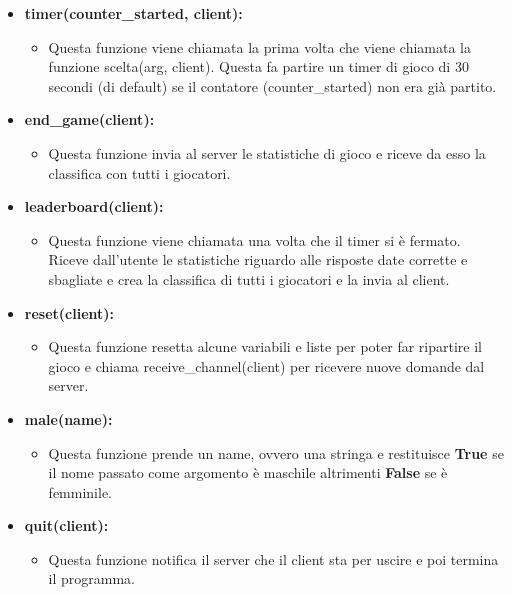 \begin{itemize}
\begin{itemize}
	\end{itemize}
	\item \textbf{\normalsize timer(counter\_started, client): }
	\begin{itemize}
		\item \textsf{\normalsize Questa funzione viene chiamata la prima volta che viene chiamata la funzione scelta(arg, client). Questa fa partire un timer di gioco di 30 secondi (di default) se il contatore (counter\_started) non era già partito.}
	\end{itemize}
	\item \textbf{\normalsize end\_game(client): }
	\begin{itemize}
		\item \textsf{\normalsize Questa funzione invia al server le statistiche di gioco e riceve da esso la classifica con tutti i giocatori.}
	\end{itemize}
	\item \textbf{\normalsize leaderboard(client): }
	\begin{itemize}
		\item \textsf{\normalsize Questa funzione viene chiamata una volta che il timer si è fermato. Riceve dall'utente le statistiche riguardo alle risposte date corrette e sbagliate e crea la classifica di tutti i giocatori e la invia al client.}
	\end{itemize}
	\item \textbf{\normalsize reset(client): }
	\begin{itemize}
		\item \textsf{\normalsize Questa funzione resetta alcune variabili e liste per poter far ripartire il gioco e chiama receive\_channel(client) per ricevere nuove domande dal server.}
	\end{itemize}
	\item \textbf{\normalsize male(name): }
	\begin{itemize}
		\item \textsf{\normalsize Questa funzione prende un name, ovvero una stringa e restituisce \textbf{True} se il nome passato come argomento è maschile altrimenti \textbf{False} se è femminile.}
	\end{itemize}
	\item \textbf{\normalsize quit(client): }
	\begin{itemize}
		\item \textsf{\normalsize Questa funzione notifica il server che il client sta per uscire e poi termina il programma.}
	\end{itemize}
\end{itemize}


